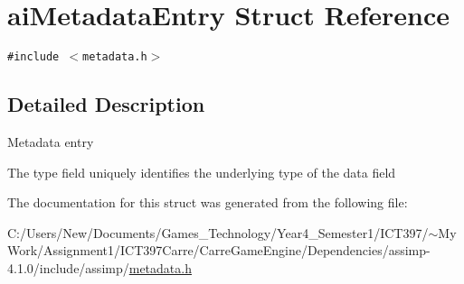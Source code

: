 \hypertarget{structai_metadata_entry}{
\section{aiMetadataEntry Struct Reference}
\label{structai_metadata_entry}
}
{\tt \#include $<$metadata.h$>$}



\subsection{Detailed Description}
Metadata entry

The type field uniquely identifies the underlying type of the data field 

The documentation for this struct was generated from the following file:\begin{CompactItemize}
\item 
C:/Users/New/Documents/Games\_\-Technology/Year4\_\-Semester1/ICT397/$\sim$My Work/Assignment1/ICT397Carre/CarreGameEngine/Dependencies/assimp-4.1.0/include/assimp/\hyperlink{metadata_8h}{metadata.h}\end{CompactItemize}
